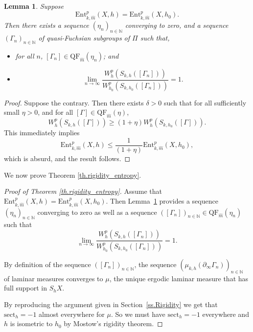 \documentclass[JEP,XML,SOM,Unicode,NoEqCountersInSection,published]{cedram}
\theoremstyle{plain}
\newtheorem{lemma}[theorem]{Lemma}
\theoremstyle{definition}
\newcommand{\sect}{\mathrm{sect}}
\newcommand{\Ent}{\mathrm{Ent}}
\newcommand{\QF}{\mathrm{QF}}
\newcommand{\bord}{\partial_{\infty}}
\begin{document}
\begin{lemma}\label{lem_converging_sequence}
Suppose
\begin{equation*}
\Ent^{p}_{k,\hat m}(X,h)=\Ent^{p}_{k,\hat m}(X,h_0).
\end{equation*}
Then there exists a sequence $(\eta_n)_{n\in\mathbb{N}}$ converging to zero, and a sequence $(\Gamma_n)_{n\in\mathbb{N}}$ of quasi-Fuchsian subgroups of $\Pi$ such that,
\begin{itemize}
\item for all $n$, $[\Gamma_n]\in\QF_{\hat m}(\eta_n)$; and
\item
\begin{equation*}
\lim_{n\to\infty}\frac{W^{p}_{h}(S_{k,h}([\Gamma_n]))}{W^{p}_{h_0}(S_{k,h_0}([\Gamma_n]))}=1.
\end{equation*}
\end{itemize}
\end{lemma}

\begin{proof}
Suppose the contrary. Then there exists $\delta>0$ such that for all sufficiently small $\eta>0$, and for all $[\Gamma]\in\QF_{\hat m}(\eta)$,
\begin{equation*}
W^{p}_{h}(S_{k,h}([\Gamma]))\geq (1+\eta) W^{p}_{h}(S_{k,h_0}([\Gamma])).
\end{equation*}
This immediately implies
\begin{equation*}
\Ent^p_{k,\hat m}(X,h)\leq\frac{1}{(1+\eta)}\Ent^{p}_{k,\hat m}(X,h_0),
\end{equation*}
which is absurd, and the result follows.
\end{proof}

We now prove Theorem \ref{th.rigidity_entropy}.

\begin{proof}[Proof of Theorem \ref{th.rigidity_entropy}] Assume that $\Ent^{p}_{k,\hat m}(X,h)=\Ent^{p}_{k,\hat m}(X,h_0)$. Then Lem\-ma~\ref{lem_converging_sequence} provides a sequence $(\eta_n)_{n\in\mathbb{N}}$ converging to zero as well as a sequence $([\Gamma_n])_{n\in\mathbb{N}}\in\QF_{\hat m}(\eta_n)$ such that
\begin{equation*}
\lim_{n\to\infty}\frac{W^{p}_{h}(S_{k,h}([\Gamma_n]))}{W^{p}_{h_0}(S_{k,h_0}([\Gamma_n]))}=1.
\end{equation*}

By definition of the sequence $([\Gamma_n])_{n\in\mathbb{N}}$, the sequence $(\mu_{k,h}(\bord \Gamma_n))_{n\in\mathbb{N}}$ of laminar measures converges to $\mu$, the unique ergodic laminar measure that has full support in $S_hX$.

By reproducing the argument given in Section~\ref{ss.Rigidity} we get that $\sect_h=-1$ almost everywhere for $\mu$. So we must have $\sect_h=-1$ everywhere and $h$ is isometric to $h_0$ by Mostow's rigidity theorem.
\end{proof}
\end{document}
